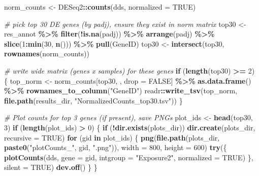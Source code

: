 \documentclass[
]{article}
\newenvironment{Shaded}{\begin{snugshade}}{\end{snugshade}}
\newcommand{\AttributeTok}[1]{\textcolor[rgb]{0.13,0.29,0.53}{#1}}
\newcommand{\CommentTok}[1]{\textcolor[rgb]{0.56,0.35,0.01}{\textit{#1}}}
\newcommand{\ConstantTok}[1]{\textcolor[rgb]{0.56,0.35,0.01}{#1}}
\newcommand{\ControlFlowTok}[1]{\textcolor[rgb]{0.13,0.29,0.53}{\textbf{#1}}}
\newcommand{\DecValTok}[1]{\textcolor[rgb]{0.00,0.00,0.81}{#1}}
\newcommand{\FunctionTok}[1]{\textcolor[rgb]{0.13,0.29,0.53}{\textbf{#1}}}
\newcommand{\NormalTok}[1]{#1}
\newcommand{\OtherTok}[1]{\textcolor[rgb]{0.56,0.35,0.01}{#1}}
\newcommand{\SpecialCharTok}[1]{\textcolor[rgb]{0.81,0.36,0.00}{\textbf{#1}}}
\newcommand{\StringTok}[1]{\textcolor[rgb]{0.31,0.60,0.02}{#1}}
\begin{document}
\begin{Shaded}
\begin{Highlighting}[]
\NormalTok{norm\_counts }\OtherTok{\textless{}{-}}\NormalTok{ DESeq2}\SpecialCharTok{::}\FunctionTok{counts}\NormalTok{(dds, }\AttributeTok{normalized =} \ConstantTok{TRUE}\NormalTok{)}

\CommentTok{\# pick top 30 DE genes (by padj), ensure they exist in norm matrix}
\NormalTok{top30 }\OtherTok{\textless{}{-}}\NormalTok{ res\_annot }\SpecialCharTok{\%\textgreater{}\%}
  \FunctionTok{filter}\NormalTok{(}\SpecialCharTok{!}\FunctionTok{is.na}\NormalTok{(padj)) }\SpecialCharTok{\%\textgreater{}\%}
  \FunctionTok{arrange}\NormalTok{(padj) }\SpecialCharTok{\%\textgreater{}\%}
  \FunctionTok{slice}\NormalTok{(}\DecValTok{1}\SpecialCharTok{:}\FunctionTok{min}\NormalTok{(}\DecValTok{30}\NormalTok{, }\FunctionTok{n}\NormalTok{())) }\SpecialCharTok{\%\textgreater{}\%}
  \FunctionTok{pull}\NormalTok{(GeneID)}
\NormalTok{top30 }\OtherTok{\textless{}{-}} \FunctionTok{intersect}\NormalTok{(top30, }\FunctionTok{rownames}\NormalTok{(norm\_counts))}

\CommentTok{\# write wide matrix (genes x samples) for these genes}
\ControlFlowTok{if}\NormalTok{ (}\FunctionTok{length}\NormalTok{(top30) }\SpecialCharTok{\textgreater{}=} \DecValTok{2}\NormalTok{) \{}
\NormalTok{  top\_norm }\OtherTok{\textless{}{-}}\NormalTok{ norm\_counts[top30, , drop }\OtherTok{=} \ConstantTok{FALSE}\NormalTok{] }\SpecialCharTok{\%\textgreater{}\%}
    \FunctionTok{as.data.frame}\NormalTok{() }\SpecialCharTok{\%\textgreater{}\%}
    \FunctionTok{rownames\_to\_column}\NormalTok{(}\StringTok{"GeneID"}\NormalTok{)}
\NormalTok{  readr}\SpecialCharTok{::}\FunctionTok{write\_tsv}\NormalTok{(top\_norm, }\FunctionTok{file.path}\NormalTok{(results\_dir, }\StringTok{"NormalizedCounts\_top30.tsv"}\NormalTok{))}
\NormalTok{\}}

\CommentTok{\# Plot counts for top 3 genes (if present), save PNGs}
\NormalTok{plot\_ids }\OtherTok{\textless{}{-}} \FunctionTok{head}\NormalTok{(top30, }\DecValTok{3}\NormalTok{)}
\ControlFlowTok{if}\NormalTok{ (}\FunctionTok{length}\NormalTok{(plot\_ids) }\SpecialCharTok{\textgreater{}} \DecValTok{0}\NormalTok{) \{}
  \ControlFlowTok{if}\NormalTok{ (}\SpecialCharTok{!}\FunctionTok{dir.exists}\NormalTok{(plots\_dir)) }\FunctionTok{dir.create}\NormalTok{(plots\_dir, }\AttributeTok{recursive =} \ConstantTok{TRUE}\NormalTok{)}
  \ControlFlowTok{for}\NormalTok{ (gid }\ControlFlowTok{in}\NormalTok{ plot\_ids) \{}
    \FunctionTok{png}\NormalTok{(}\FunctionTok{file.path}\NormalTok{(plots\_dir, }\FunctionTok{paste0}\NormalTok{(}\StringTok{"plotCounts\_"}\NormalTok{, gid, }\StringTok{".png"}\NormalTok{)), }\AttributeTok{width =} \DecValTok{800}\NormalTok{, }\AttributeTok{height =} \DecValTok{600}\NormalTok{)}
    \FunctionTok{try}\NormalTok{(\{}
      \FunctionTok{plotCounts}\NormalTok{(dds, }\AttributeTok{gene =}\NormalTok{ gid, }\AttributeTok{intgroup =} \StringTok{"Exposure2"}\NormalTok{, }\AttributeTok{normalized =} \ConstantTok{TRUE}\NormalTok{)}
\NormalTok{    \}, }\AttributeTok{silent =} \ConstantTok{TRUE}\NormalTok{)}
    \FunctionTok{dev.off}\NormalTok{()}
\NormalTok{  \}}
\NormalTok{\}}
\end{Highlighting}
\end{Shaded}
\end{document}
